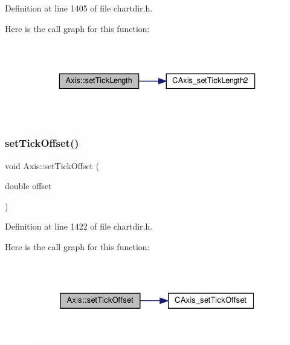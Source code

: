 Definition at line 1405 of file chartdir.\+h.

Here is the call graph for this function\+:
\nopagebreak
\begin{figure}[H]
\begin{center}
\leavevmode
\includegraphics[width=336pt]{class_axis_a80b7689e4f8ce5961937b9da00d9a5d7_cgraph}
\end{center}
\end{figure}
\mbox{\label{class_axis_a5fa46a2ec10970e274f1d07e3f2754d7}} 
\subsubsection{\texorpdfstring{set\+Tick\+Offset()}{setTickOffset()}}
{\footnotesize\ttfamily void Axis\+::set\+Tick\+Offset (\begin{DoxyParamCaption}\item[{double}]{offset }\end{DoxyParamCaption})\hspace{0.3cm}{\ttfamily [inline]}}



Definition at line 1422 of file chartdir.\+h.

Here is the call graph for this function\+:
\nopagebreak
\begin{figure}[H]
\begin{center}
\leavevmode
\includegraphics[width=325pt]{class_axis_a5fa46a2ec10970e274f1d07e3f2754d7_cgraph}
\end{center}
\end{figure}
\mbox{\label{class_axis_a62799546985d8e3839515dacc54ffcdc}} 
